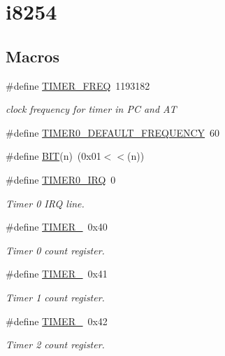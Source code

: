 \hypertarget{group__i8254}{}\section{i8254}
\label{group__i8254}
\subsection*{Macros}
\begin{DoxyCompactItemize}
\item 
\#define \hyperlink{group__i8254_gacf926951944b6cf370b7229ebd50dd8b}{T\+I\+M\+E\+R\+\_\+\+F\+R\+EQ}~1193182
\begin{DoxyCompactList}\small\item\em clock frequency for timer in PC and AT \end{DoxyCompactList}\item 
\#define \hyperlink{group__i8254_ga12949f80c4101a3d1f40ebfc202b4914}{T\+I\+M\+E\+R0\+\_\+\+D\+E\+F\+A\+U\+L\+T\+\_\+\+F\+R\+E\+Q\+U\+E\+N\+CY}~60
\item 
\#define \hyperlink{group__i8254_ga3a8ea58898cb58fc96013383d39f482c}{B\+IT}(n)~(0x01$<$$<$(n))
\item 
\#define \hyperlink{group__i8254_ga30bf84c312af248cb81bb224e09f9ba8}{T\+I\+M\+E\+R0\+\_\+\+I\+RQ}~0
\begin{DoxyCompactList}\small\item\em Timer 0 I\+RQ line. \end{DoxyCompactList}\item 
\#define \hyperlink{group__i8254_gacc9ff9df4a9674a1ce9ba08fc4a4679e}{T\+I\+M\+E\+R\+\_}~0x40
\begin{DoxyCompactList}\small\item\em Timer 0 count register. \end{DoxyCompactList}\item 
\#define \hyperlink{group__i8254_gac62c99c2a9289891c1b83052242cca49}{T\+I\+M\+E\+R\+\_}~0x41
\begin{DoxyCompactList}\small\item\em Timer 1 count register. \end{DoxyCompactList}\item 
\#define \hyperlink{group__i8254_ga1f34f18ad0ab8cace46b615773b48735}{T\+I\+M\+E\+R\+\_}~0x42
\begin{DoxyCompactList}\small\item\em Timer 2 count register. \end{DoxyCompactList}\item 
$$
\end{DoxyCompactItemize}
